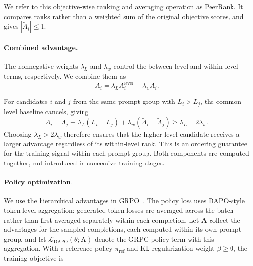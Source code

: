 We refer to this objective-wise ranking and averaging operation as PeerRank. It compares ranks rather than a weighted sum of the original objective scores, and gives \(|\widetilde A_i|\leq1\).


\paragraph{Combined advantage.}

The nonnegative weights \(\lambda_L\) and \(\lambda_w\) control the between-level and within-level terms, respectively. We combine them as
\begin{equation}
A_i=\lambda_L A_i^{\mathrm{level}}+\lambda_w\widetilde A_i.
\label{eq:hba}
\end{equation}

For candidates \(i\) and \(j\) from the same prompt group with \(L_i>L_j\), the common level baseline cancels, giving
\[
A_i-A_j
=\lambda_L(L_i-L_j)+\lambda_w(\widetilde A_i-\widetilde A_j)
\geq\lambda_L-2\lambda_w.
\]
Choosing \(\lambda_L>2\lambda_w\) therefore ensures that the higher-level candidate receives a larger advantage regardless of its within-level rank. This is an ordering guarantee for the training signal within each prompt group. Both components are computed together, not introduced in successive training stages.

\paragraph{Policy optimization.}
\label{sec:policy_optimization}

We use the hierarchical advantages in GRPO~\citep{shao2024deepseekmath}. The policy loss uses DAPO-style token-level aggregation: generated-token losses are averaged across the batch rather than first averaged separately within each completion. Let \(\mathbf A\) collect the advantages for the sampled completions, each computed within its own prompt group, and let \(\mathcal L_{\mathrm{DAPO}}(\theta;\mathbf A)\) denote the GRPO policy term with this aggregation. With a reference policy \(\pi_{\mathrm{ref}}\) and KL regularization weight \(\beta\geq0\), the training objective is

